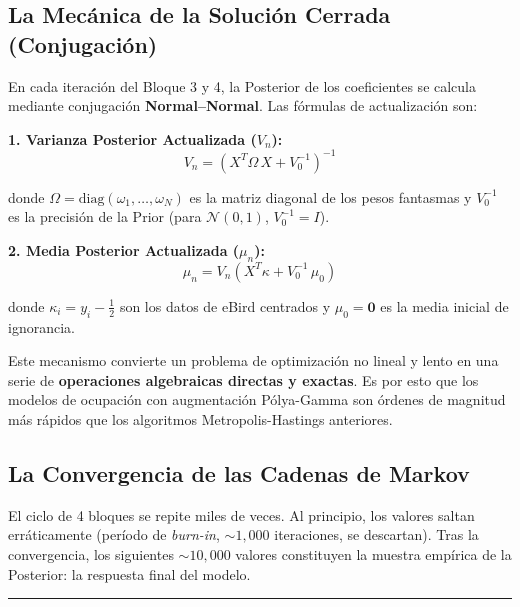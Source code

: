 \documentclass[12pt, a4paper]{article}
\begin{document}
\subsection{La Mecánica de la Solución Cerrada (Conjugación)}

En cada iteración del Bloque 3 y 4, la Posterior de los coeficientes se calcula mediante conjugación \textbf{Normal--Normal}. Las fórmulas de actualización son:

\medskip
\textbf{1. Varianza Posterior Actualizada ($V_n$):}
\begin{equation}
  V_n = \left(X^T \Omega\, X + V_0^{-1}\right)^{-1}
\end{equation}

\noindent donde $\Omega = \text{diag}(\omega_1, \dots, \omega_N)$ es la matriz diagonal de los pesos fantasmas y $V_0^{-1}$ es la precisión de la Prior (para $\mathcal{N}(0,1)$, $V_0^{-1} = I$).

\medskip
\textbf{2. Media Posterior Actualizada ($\mu_n$):}
\begin{equation}
  \mu_n = V_n \left(X^T \kappa + V_0^{-1}\,\mu_0\right)
\end{equation}

\noindent donde $\kappa_i = y_i - \tfrac{1}{2}$ son los datos de eBird centrados y $\mu_0 = \mathbf{0}$ es la media inicial de ignorancia.

\begin{notabox}
\small Este mecanismo convierte un problema de optimización no lineal y lento en una serie de \textbf{operaciones algebraicas directas y exactas}. Es por esto que los modelos de ocupación con augmentación Pólya-Gamma son órdenes de magnitud más rápidos que los algoritmos Metropolis-Hastings anteriores.
\end{notabox}

\subsection{La Convergencia de las Cadenas de Markov}

El ciclo de 4 bloques se repite miles de veces. Al principio, los valores saltan erráticamente (período de \textit{burn-in}, ${\sim}1{,}000$ iteraciones, se descartan). Tras la convergencia, los siguientes ${\sim}10{,}000$ valores constituyen la muestra empírica de la Posterior: la respuesta final del modelo.

\hrule
\vspace{1em}

\end{document}
